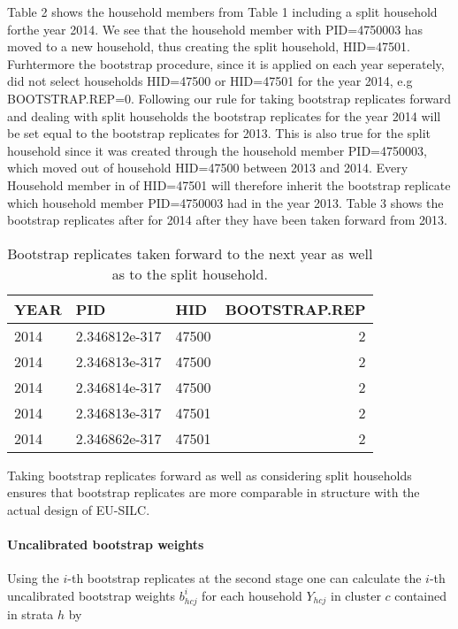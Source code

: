 \documentclass{scrartcl}\usepackage[]{graphicx}\usepackage[]{color}
\begin{document}
Table 2 shows the household members from Table 1 including a split household forthe year 2014. We see that the household member with PID=4750003 has moved to a new household, thus creating the split household, HID=47501.
Furhtermore the bootstrap procedure, since it is applied on each year seperately, did not select households HID=47500 or HID=47501 for the year 2014, e.g BOOTSTRAP.REP=0.
Following our rule for taking bootstrap replicates forward and dealing with split households the bootstrap replicates for the year 2014 will be set equal to the bootstrap replicates for 2013. This is also true for the split household since it was created through the household member PID=4750003, which moved out of household HID=47500 between 2013 and 2014. Every Household member in of HID=47501 will therefore inherit the bootstrap replicate which household member PID=4750003 had in the year 2013. Table 3 shows the bootstrap replicates after for 2014 after they have been taken forward from 2013.

\begin{table}

\caption{\label{tab:unnamed-chunk-4}Bootstrap replicates taken forward to the next year as well as to the split household.}
\centering
\begin{tabular}[t]{lllr}
\toprule
YEAR & PID & HID & BOOTSTRAP.REP\\
\midrule
2014 & 2.346812e-317 & 47500 & 2\\
2014 & 2.346813e-317 & 47500 & 2\\
2014 & 2.346814e-317 & 47500 & 2\\
2014 & 2.346813e-317 & 47501 & 2\\
2014 & 2.346862e-317 & 47501 & 2\\
\bottomrule
\end{tabular}
\end{table}



Taking bootstrap replicates forward as well as considering split households ensures that bootstrap replicates are more comparable in structure with the actual design of EU-SILC.

\paragraph{Uncalibrated bootstrap weights}
Using the $i$-th bootstrap replicates at the second stage one can calculate the $i$-th uncalibrated bootstrap weights $b_{hcj}^{i}$ for each household $Y_{hcj}$ in cluster $c$ contained in strata $h$ by
\end{document}

